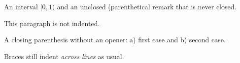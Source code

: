 \documentclass{article}
\begin{document}
An interval $[0,1)$ and an unclosed (parenthetical
remark that is never closed.

This paragraph is not indented.

A closing parenthesis without an opener: a) first case
and b) second case.

Braces still indent \emph{across
lines} as usual.
\end{document}
